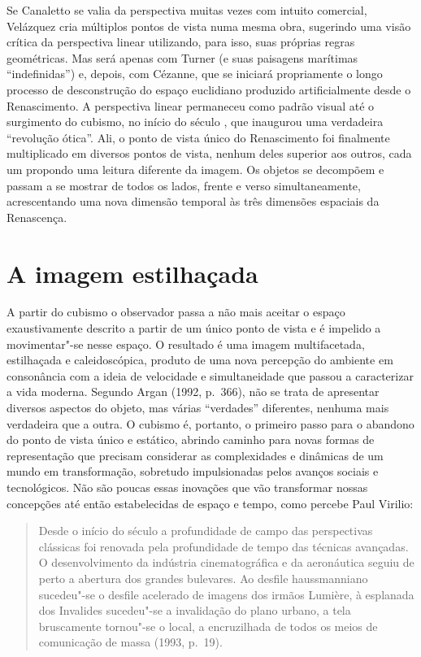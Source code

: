 Se Canaletto se valia da perspectiva muitas vezes com intuito comercial,
Velázquez cria múltiplos pontos de vista numa mesma obra, sugerindo uma
visão crítica da perspectiva linear utilizando, para isso, suas próprias
regras geométricas. Mas será apenas com Turner (e suas paisagens
marítimas ``indefinidas'') e, depois, com Cézanne, que se iniciará
propriamente o longo processo de desconstrução do espaço euclidiano
produzido artificialmente desde o Renascimento. A perspectiva linear
permaneceu como padrão visual até o surgimento do cubismo, no início do
século , que inaugurou uma verdadeira ``revolução ótica''. Ali, o
ponto de vista único do Renascimento foi finalmente multiplicado em
diversos pontos de vista, nenhum deles superior aos outros, cada um
propondo uma leitura diferente da imagem. Os objetos se decompõem e
passam a se mostrar de todos os lados, frente e verso simultaneamente,
acrescentando uma nova dimensão temporal às três dimensões espaciais da
Renascença.

\chapter{A imagem estilhaçada}

A partir do cubismo o observador passa a não mais aceitar o espaço
exaustivamente descrito a partir de um único ponto de vista e é impelido
a movimentar"-se nesse espaço. O resultado é uma imagem multifacetada,
estilhaçada e caleidoscópica, produto de uma nova percepção do ambiente
em consonância com a ideia de velocidade e simultaneidade que passou a
caracterizar a vida moderna. Segundo Argan (1992, p.~366), não se trata
de apresentar diversos aspectos do objeto, mas várias ``verdades''
diferentes, nenhuma mais verdadeira que a outra. O cubismo é, portanto,
o primeiro passo para o abandono do ponto de vista único e estático,
abrindo caminho para novas formas de representação que precisam
considerar as complexidades e dinâmicas de um mundo em transformação,
sobretudo impulsionadas pelos avanços sociais e tecnológicos. Não são
poucas essas inovações que vão transformar nossas concepções até então
estabelecidas de espaço e tempo, como percebe Paul Virilio:

\begin{quote}
Desde o início do século  a profundidade de campo das perspectivas
clássicas foi renovada pela profundidade de tempo das técnicas
avançadas. O desenvolvimento da indústria cinematográfica e da
aeronáutica seguiu de perto a abertura dos grandes bulevares. Ao desfile
haussmanniano sucedeu"-se o desfile acelerado de imagens dos irmãos
Lumière, à esplanada dos Invalides sucedeu"-se a invalidação do plano
urbano, a tela bruscamente tornou"-se o local, a encruzilhada de todos os
meios de comunicação de massa (1993, p.~19).
\end{quote}

